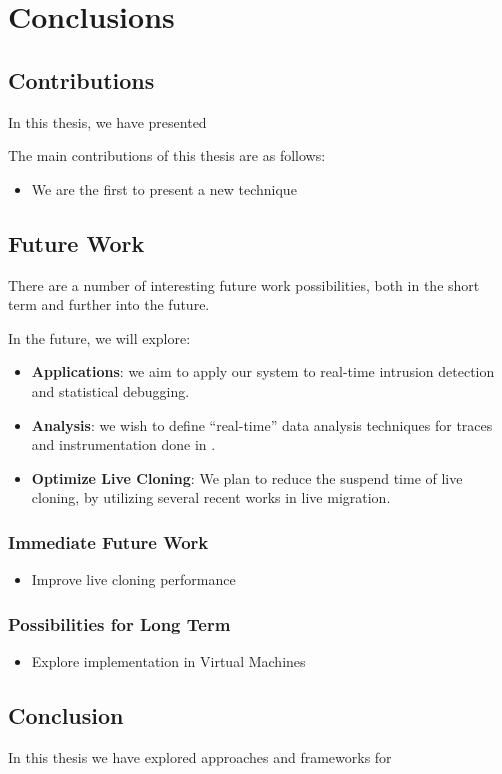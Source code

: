 \chapter{Conclusions}
\label{ch:conclusions}

\section{Contributions}
\label{sec:contributions}

In this thesis, we have presented 

The main contributions of this thesis are as follows:

\begin{itemize}
	\item We are the first to present a new technique 
\end{itemize}

\section{Future Work}
\label{sec:future}

There are a number of interesting future work possibilities, both in the short term and further into the future.

In the future, we will explore: 
\begin{itemize}
	\item \textbf{Applications}: we aim to apply our system to real-time intrusion detection and statistical debugging.
	\item \textbf{Analysis}: we wish to define ``real-time'' data analysis techniques for traces and instrumentation done in \parikshan.
	\item \textbf{Optimize Live Cloning}: We plan to reduce the suspend time of live cloning, by utilizing several recent works in live migration.
\end{itemize}


\subsection{Immediate Future Work}
\label{sec:immediate}

\begin{itemize}
	\item Improve live cloning performance
\end{itemize}

\subsection{Possibilities for Long Term}
\label{sec:longterm}

\begin{itemize}
	\item Explore implementation in Virtual Machines
\end{itemize}

\section{Conclusion}
\label{sec:conclusion}

In this thesis we have explored approaches and frameworks for 